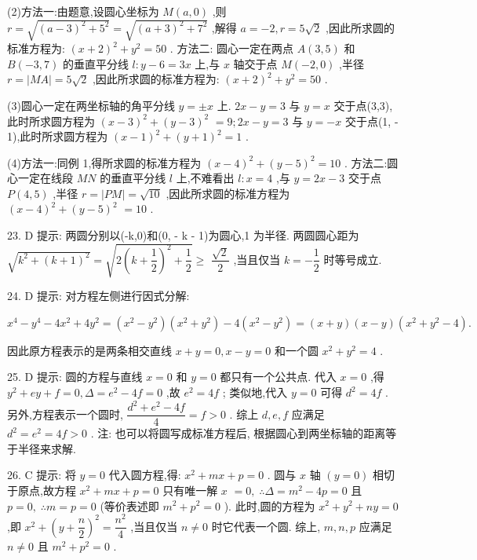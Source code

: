 (2)方法一:由题意,设圆心坐标为 $M\left( {a,0}\right)$ ,则 $r = \sqrt{{\left( a - 3\right) }^{2} + {5}^{2}} = \sqrt{{\left( a + 3\right) }^{2} + {7}^{2}}$ ,解得 $a =  - 2,r = 5\sqrt{2}$ ,因此所求圆的标准方程为: ${\left( x + 2\right) }^{2} + {y}^{2} = {50}$ . 方法二: 圆心一定在两点 $A\left( {3,5}\right)$ 和 $B\left( {-3,7}\right)$ 的垂直平分线 $l : y - 6 = {3x}$ 上,与 $x$ 轴交于点 $M\left( {-2,0}\right)$ ,半径 $r = \left| {MA}\right|  = 5\sqrt{2}$ ,因此所求圆的标准方程为: ${\left( x + 2\right) }^{2} + {y}^{2} = {50}$ .

(3)圆心一定在两坐标轴的角平分线 $y =  \pm  x$ 上. ${2x} - y = 3$ 与 $y = x$ 交于点(3,3),此时所求圆方程为 ${\left( x - 3\right) }^{2} + {\left( y - 3\right) }^{2}$  $= 9;{2x} - y = 3$ 与 $y =  - x$ 交于点(1, - 1),此时所求圆方程为 ${\left( x - 1\right) }^{2} + {\left( y + 1\right) }^{2} = 1$ .

(4)方法一:同例 1,得所求圆的标准方程为 ${\left( x - 4\right) }^{2} + {\left( y - 5\right) }^{2} = {10}$ . 方法二:圆心一定在线段 ${MN}$ 的垂直平分线 $l$ 上,不难看出 $l : x = 4$ ,与 $y = {2x} - 3$ 交于点 $P\left( {4,5}\right)$ ,半径 $r = \left| {PM}\right|  = \sqrt{10}$ ,因此所求圆的标准方程为 ${\left( x - 4\right) }^{2} + {\left( y - 5\right) }^{2}$  $= {10}$ .

23. D 提示: 两圆分别以(-k,0)和(0, - k - 1)为圆心,1 为半径. 两圆圆心距为 $\sqrt{{k}^{2} + {\left( k + 1\right) }^{2}} = \sqrt{2{\left( k + \dfrac{1}{2}\right) }^{2} + \dfrac{1}{2}} \geq$  $\dfrac{\sqrt{2}}{2}$ ,当且仅当 $k =  - \dfrac{1}{2}$ 时等号成立.

24. D 提示: 对方程左侧进行因式分解:

${x}^{4} - {y}^{4} - 4{x}^{2} + 4{y}^{2} = \left( {{x}^{2} - {y}^{2}}\right) \left( {{x}^{2} + {y}^{2}}\right)  - 4\left( {{x}^{2} - {y}^{2}}\right)  = \left( {x + y}\right) \left( {x - y}\right) \left( {{x}^{2} + {y}^{2} - 4}\right) .$

因此原方程表示的是两条相交直线 $x + y = 0,x - y = 0$ 和一个圆 ${x}^{2} + {y}^{2} = 4$ .

25. D 提示: 圆的方程与直线 $x = 0$ 和 $y = 0$ 都只有一个公共点. 代入 $x = 0$ ,得 ${y}^{2} + {ey} + f = 0,\Delta  = {e}^{2} - {4f} = 0$ ,故 ${e}^{2} = {4f}$ ; 类似地,代入 $y = 0$ 可得 ${d}^{2} = {4f}$ . 另外,方程表示一个圆时, $\dfrac{{d}^{2} + {e}^{2} - {4f}}{4} = f > 0$ . 综上 $d,e,f$ 应满足 ${d}^{2} = {e}^{2} = {4f} > 0$ . 注: 也可以将圆写成标准方程后, 根据圆心到两坐标轴的距离等于半径来求解.

26. C 提示: 将 $y = 0$ 代入圆方程,得: ${x}^{2} + {mx} + p = 0$ . 圆与 $x$ 轴 $\left( {y = 0}\right)$ 相切于原点,故方程 ${x}^{2} + {mx} + p = 0$ 只有唯一解 $x$  $= 0,\;\therefore \Delta  = {m}^{2} - {4p} = 0$ 且 $p = 0,\;\therefore m = p = 0$ (等价表述即 ${m}^{2} + {p}^{2} = 0$ ). 此时,圆的方程为 ${x}^{2} + {y}^{2} + {ny} = 0$ ,即 ${x}^{2} + {\left( y + \dfrac{n}{2}\right) }^{2} = \dfrac{{n}^{2}}{4}$ ,当且仅当 $n \neq  0$ 时它代表一个圆. 综上, $m,n,p$ 应满足 $n \neq  0$ 且 ${m}^{2} + {p}^{2} = 0$ .


